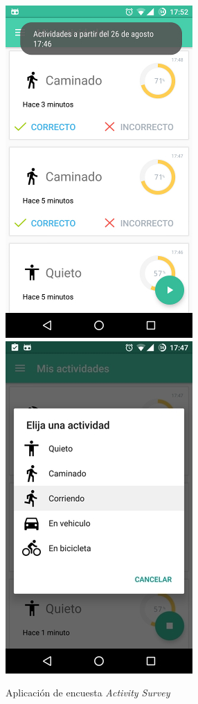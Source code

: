 \begin{figure}[H]
\begin{centering}
\includegraphics[scale=0.6]{capitulo-6/graphics/activities_toast}
\includegraphics[scale=0.6]{capitulo-6/graphics/act_feed2}
\par\end{centering}
\caption{\label{fig6:activity-survey}Aplicación de encuesta\emph{ Activity
Survey}}

\end{figure}

